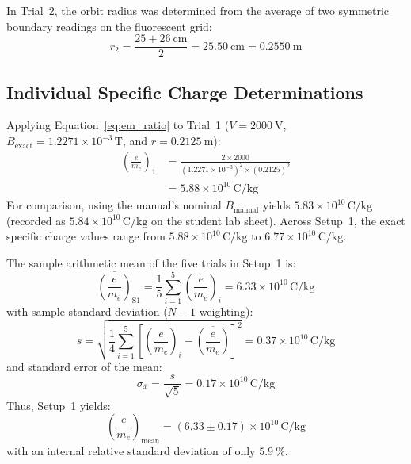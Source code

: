 \documentclass[journal]{IEEEtran}
\begin{document}
In Trial~2, the orbit radius was determined from the average of two symmetric boundary readings on the fluorescent grid:
\begin{equation*}
    r_2 = \frac{25 + \SI{26}{\centi\meter}}{2} = \SI{25.50}{\centi\meter} = \SI{0.2550}{\meter}
\end{equation*}

\subsection{Individual Specific Charge Determinations}
Applying Equation~\eqref{eq:em_ratio} to Trial~1 ($V = \SI{2000}{\volt}$, $B_{\text{exact}} = 1.2271 \times 10^{-3}\,\mathrm{T}$, and $r = \SI{0.2125}{\meter}$):
\begin{align*}
    \left(\frac{e}{m_e}\right)_1 &= \frac{2 \times 2000}{(1.2271 \times 10^{-3})^2 \times (0.2125)^2} \\
    &= 5.88 \times 10^{10}\,\mathrm{C/kg}
\end{align*}
For comparison, using the manual's nominal $B_{\text{manual}}$ yields $5.83 \times 10^{10}\,\mathrm{C/kg}$ (recorded as $5.84 \times 10^{10}\,\mathrm{C/kg}$ on the student lab sheet). Across Setup~1, the exact specific charge values range from $5.88 \times 10^{10}\,\mathrm{C/kg}$ to $6.77 \times 10^{10}\,\mathrm{C/kg}$.

The sample arithmetic mean of the five trials in Setup~1 is:
\begin{equation}
    \overline{\left(\frac{e}{m_e}\right)}_{\text{S1}} = \frac{1}{5}\sum_{i=1}^5 \left(\frac{e}{m_e}\right)_i = 6.33 \times 10^{10}\,\mathrm{C/kg}
\end{equation}
with sample standard deviation ($N-1$ weighting):
\begin{equation}
    s = \sqrt{\frac{1}{4}\sum_{i=1}^5 \left[\left(\frac{e}{m_e}\right)_i - \overline{\left(\frac{e}{m_e}\right)}\right]^2} = 0.37 \times 10^{10}\,\mathrm{C/kg}
\end{equation}
and standard error of the mean:
\begin{equation}
    \sigma_{\overline{x}} = \frac{s}{\sqrt{5}} = 0.17 \times 10^{10}\,\mathrm{C/kg}
\end{equation}
Thus, Setup~1 yields:
\begin{equation}
    \left(\frac{e}{m_e}\right)_{\text{mean}} = (6.33 \pm 0.17) \times 10^{10}\,\mathrm{C/kg}
\end{equation}
with an internal relative standard deviation of only $\SI{5.9}{\percent}$.
\end{document}
